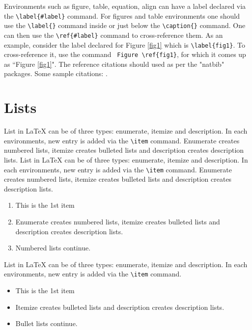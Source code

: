 \documentclass{CUP-JNL-NMJ}%
\theoremstyle{cupplain}
\theoremstyle{cupremark}
\theoremstyle{cupdefinition}
\theoremstyle{cupproof}
\numberwithin{equation}{section}
\begin{document}
Environments such as figure, table, equation, align can have a label
declared via the \verb+\label{#label}+ command. For figures and table
environments one should use the \verb+\label{}+ command inside or just
below the \verb+\caption{}+ command.  One can then use the
\verb+\ref{#label}+ command to cross-reference them. As an example, consider
the label declared for Figure \ref{fig1} which is
\verb+\label{fig1}+. To cross-reference it, use the command
\verb+ Figure \ref{fig1}+, for which it comes up as
``Figure \ref{fig1}".
The reference citations should used as per the "natbib" packages. Some sample citations:  \cite{r1,r2}.

\section{Lists}
List in \LaTeX{} can be of three types: enumerate, itemize and description.
In each environments, new entry is added via the \verb+\item+ command.
Enumerate creates numbered lists, itemize creates bulleted lists and
description creates description lists.
List in \LaTeX{} can be of three types: enumerate, itemize and description.
In each environments, new entry is added via the \verb+\item+ command.
Enumerate creates numbered lists, itemize creates bulleted lists and
description creates description lists.
\begin{enumerate}[1.]
\item This is the 1st item
\item Enumerate creates numbered lists, itemize creates bulleted lists and
description creates description lists.
\item Numbered lists continue.
\end{enumerate}
List in \LaTeX{} can be of three types: enumerate, itemize and description.
In each environments, new entry is added via the \verb+\item+ command.
\begin{itemize}
\item This is the 1st item
\item Itemize creates bulleted lists and
description creates description lists.
\item Bullet lists continue.
\end{itemize}
\end{document}
